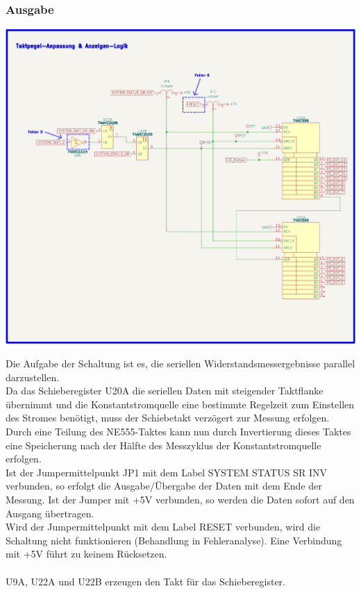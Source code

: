 \subsubsection{Ausgabe}
\begin{center}
\includegraphics[width=15cm]{Bilder/Anzeige-Logik.png}
\end{center}

Die Aufgabe der Schaltung ist es, die seriellen Widerstandsmessergebnisse parallel darzustellen. 
\\
Da das Schieberegister U20A die seriellen Daten mit steigender Taktflanke übernimmt und die Konstantstromquelle eine bestimmte Regelzeit zum Einstellen des Stromes benötigt, muss der Schiebetakt verzögert zur Messung erfolgen. Durch eine Teilung des NE555-Taktes kann nun durch Invertierung dieses Taktes eine Speicherung nach der Hälfte des Messzyklus der Konstantstromquelle erfolgen.
\\
Ist der Jumpermittelpunkt JP1 mit dem Label \glqq SYSTEM STATUS SR INV \grqq{} verbunden, so erfolgt die Ausgabe/Übergabe der Daten mit dem Ende der Messung. Ist der Jumper mit +5V verbunden, so werden die Daten sofort auf den Ausgang übertragen.
\\
Wird der Jumpermittelpunkt mit dem Label \glqq RESET \grqq{} verbunden, wird die Schaltung nicht funktionieren (Behandlung in Fehleranalyse). Eine Verbindung mit +5V führt zu keinem Rücksetzen.
\\
\\
U9A, U22A und U22B erzeugen den Takt für das Schieberegister. 

